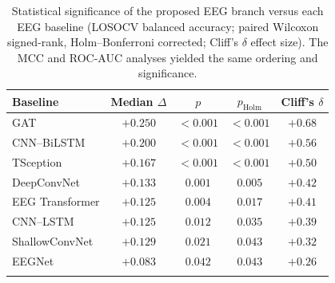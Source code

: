 \begin{table}[t]
  \caption{Statistical significance of the proposed EEG branch versus each EEG baseline (LOSOCV balanced accuracy; paired Wilcoxon signed-rank, Holm--Bonferroni corrected; Cliff's $\delta$ effect size). The MCC and ROC-AUC analyses yielded the same ordering and significance.}
  \label{tab:significance}
  \centering
  \small
  \begin{tabular}{@{}lcccc@{}}
    \toprule
    Baseline & Median $\Delta$ & $p$ & $p_{\mathrm{Holm}}$ & Cliff's $\delta$ \\
    \midrule
    GAT             & $+0.250$ & $<0.001$ & $<0.001$ & $+0.68$ \\
    CNN--BiLSTM     & $+0.200$ & $<0.001$ & $<0.001$ & $+0.56$ \\
    TSception       & $+0.167$ & $<0.001$ & $<0.001$ & $+0.50$ \\
    DeepConvNet     & $+0.133$ & $0.001$  & $0.005$  & $+0.42$ \\
    EEG Transformer & $+0.125$ & $0.004$  & $0.017$  & $+0.41$ \\
    CNN--LSTM       & $+0.125$ & $0.012$  & $0.035$  & $+0.39$ \\
    ShallowConvNet  & $+0.129$ & $0.021$  & $0.043$  & $+0.32$ \\
    EEGNet          & $+0.083$ & $0.042$  & $0.043$  & $+0.26$ \\
    \botrule
  \end{tabular}
\end{table}
